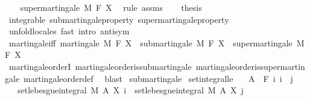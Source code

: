 \begin{isabellebody}
\ \ \isamarkupfalse%
\ supermartingale\ M\ F\ X\ \isamarkupfalse%
\ {\isacharparenleft}{\kern0pt}rule\ assms{\isacharparenright}{\kern0pt}\isanewline
\ \ \isamarkupfalse%
\ {\isacharquery}{\kern0pt}thesis\ \isamarkupfalse%
\ integrable\ submartingale{\isacharunderscore}{\kern0pt}property\ supermartingale{\isacharunderscore}{\kern0pt}property\ \isamarkupfalse%
\ {\isacharparenleft}{\kern0pt}unfold{\isacharunderscore}{\kern0pt}locales{\isacharparenright}{\kern0pt}\ {\isacharparenleft}{\kern0pt}fast\ intro{\isacharcolon}{\kern0pt}\ antisym{\isacharparenright}{\kern0pt}{\isacharplus}{\kern0pt}\isanewline
{}\isamarkupfalse%
%
\endisatagproof
{\isafoldproof}%
%
\isadelimproof
\isanewline
%
\endisadelimproof
\isanewline
{}\isamarkupfalse%
\ martingale{\isacharunderscore}{\kern0pt}iff{\isacharcolon}{\kern0pt}\ {\isachardoublequoteopen}martingale\ M\ F\ X\ {\isasymlongleftrightarrow}\ submartingale\ M\ F\ X\ {\isasymand}\ supermartingale\ M\ F\ X{\isachardoublequoteclose}\isanewline
%
\isadelimproof
\ \ %
\endisadelimproof
%
\isatagproof
{}\isamarkupfalse%
\ martingale{\isacharunderscore}{\kern0pt}orderI\ martingale{\isacharunderscore}{\kern0pt}order{\isachardot}{\kern0pt}is{\isacharunderscore}{\kern0pt}submartingale\ martingale{\isacharunderscore}{\kern0pt}order{\isachardot}{\kern0pt}is{\isacharunderscore}{\kern0pt}supermartingale\ martingale{\isacharunderscore}{\kern0pt}order{\isacharunderscore}{\kern0pt}def\ \isamarkupfalse%
\ blast%
\endisatagproof
{\isafoldproof}%
%
\isadelimproof
%
\endisadelimproof
%
\isadelimdocument
%
\endisadelimdocument
%
\isatagdocument
%
\isamarkuptrue%
%
\endisatagdocument
{\isafolddocument}%
%
\isadelimdocument
%
\endisadelimdocument
{}\isamarkupfalse%
\ submartingale\isanewline
{}\isanewline
\isanewline
{}\isamarkupfalse%
\ set{\isacharunderscore}{\kern0pt}integral{\isacharunderscore}{\kern0pt}le{\isacharcolon}{\kern0pt}\isanewline
\ \ \ {\isachardoublequoteopen}A\ {\isasymin}\ F\ i{\isachardoublequoteclose}\ {\isachardoublequoteopen}i\ {\isasymle}\ j{\isachardoublequoteclose}\isanewline
\ \ \ {\isachardoublequoteopen}set{\isacharunderscore}{\kern0pt}lebesgue{\isacharunderscore}{\kern0pt}integral\ M\ A\ {\isacharparenleft}{\kern0pt}X\ i{\isacharparenright}{\kern0pt}\ {\isasymle}\ set{\isacharunderscore}{\kern0pt}lebesgue{\isacharunderscore}{\kern0pt}integral\ M\ A\ {\isacharparenleft}{\kern0pt}X\ j{\isacharparenright}{\kern0pt}{\isachardoublequoteclose}\ \isanewline

\end{isabellebody}

